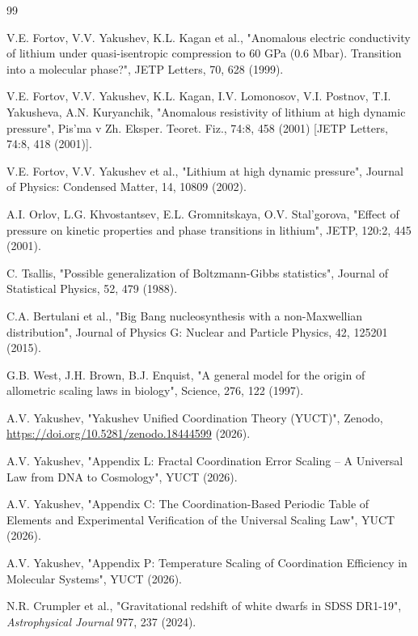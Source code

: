 \documentclass[11pt,a4paper]{article}
\theoremstyle{remark}
\begin{document}
	\begin{thebibliography}{99}
		
		V.E. Fortov, V.V. Yakushev, K.L. Kagan et al., "Anomalous electric conductivity of lithium under quasi-isentropic compression to 60 GPa (0.6 Mbar). Transition into a molecular phase?", JETP Letters, 70, 628 (1999).
		
		V.E. Fortov, V.V. Yakushev, K.L. Kagan, I.V. Lomonosov, V.I. Postnov, T.I. Yakusheva, A.N. Kuryanchik, "Anomalous resistivity of lithium at high dynamic pressure", Pis'ma v Zh. Eksper. Teoret. Fiz., 74:8, 458 (2001) [JETP Letters, 74:8, 418 (2001)].
		
		V.E. Fortov, V.V. Yakushev et al., "Lithium at high dynamic pressure", Journal of Physics: Condensed Matter, 14, 10809 (2002).
		
		A.I. Orlov, L.G. Khvostantsev, E.L. Gromnitskaya, O.V. Stal'gorova, "Effect of pressure on kinetic properties and phase transitions in lithium", JETP, 120:2, 445 (2001).
		
		C. Tsallis, "Possible generalization of Boltzmann-Gibbs statistics", Journal of Statistical Physics, 52, 479 (1988).
		
		C.A. Bertulani et al., "Big Bang nucleosynthesis with a non-Maxwellian distribution", Journal of Physics G: Nuclear and Particle Physics, 42, 125201 (2015).
		
		G.B. West, J.H. Brown, B.J. Enquist, "A general model for the origin of allometric scaling laws in biology", Science, 276, 122 (1997).
		
		A.V. Yakushev, "Yakushev Unified Coordination Theory (YUCT)", Zenodo, \url{https://doi.org/10.5281/zenodo.18444599} (2026).
		
		A.V. Yakushev, "Appendix L: Fractal Coordination Error Scaling – A Universal Law from DNA to Cosmology", YUCT (2026).
		
		A.V. Yakushev, "Appendix C: The Coordination-Based Periodic Table of Elements and Experimental Verification of the Universal Scaling Law", YUCT (2026).
		
		A.V. Yakushev, "Appendix P: Temperature Scaling of Coordination Efficiency in Molecular Systems", YUCT (2026).
		
		N.R. Crumpler et al., "Gravitational redshift of white dwarfs in SDSS DR1-19", \emph{Astrophysical Journal} 977, 237 (2024).
		

\end{thebibliography}
\end{document}
